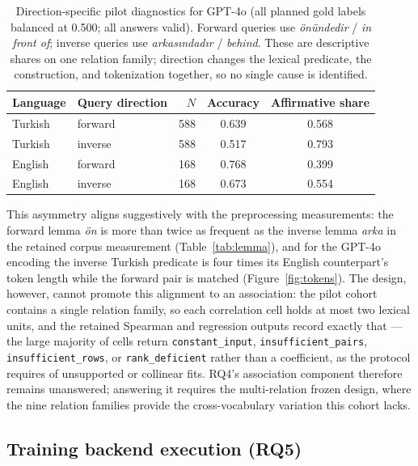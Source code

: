 \begin{table}[t]
  \centering
  \caption{Direction-specific pilot diagnostics for GPT-4o (all planned gold labels balanced at 0.500;
  all answers valid). Forward queries use \emph{önündedir} / \emph{in front of}; inverse queries use
  \emph{arkasındadır} / \emph{behind}. These are descriptive shares on one relation family; direction
  changes the lexical predicate, the construction, and tokenization together, so no single cause is
  identified.}
  \label{tab:direction}
  \small
  \begin{tabular}{@{}llrcc@{}}
    \toprule
    Language & Query direction & $N$ & Accuracy & Affirmative share \\
    \midrule
    Turkish & forward & 588 & 0.639 & 0.568 \\
    Turkish & inverse & 588 & 0.517 & 0.793 \\
    English & forward & 168 & 0.768 & 0.399 \\
    English & inverse & 168 & 0.673 & 0.554 \\
    \bottomrule
  \end{tabular}
\end{table}

This asymmetry aligns suggestively with the preprocessing measurements: the forward lemma \emph{ön} is
more than twice as frequent as the inverse lemma \emph{arka} in the retained corpus measurement
(Table~\ref{tab:lemma}), and for the GPT-4o encoding the inverse Turkish predicate is four times its
English counterpart's token length while the forward pair is matched (Figure~\ref{fig:tokens}). The
design, however, cannot promote this alignment to an association: the pilot cohort contains a single
relation family, so each correlation cell holds at most two lexical units, and the retained Spearman and
regression outputs record exactly that --- the large majority of cells return \texttt{constant\_input},
\texttt{insufficient\_pairs}, \texttt{insufficient\_rows}, or \texttt{rank\_deficient} rather than a
coefficient, as the protocol requires of unsupported or collinear fits. RQ4's association component
therefore remains unanswered; answering it requires the multi-relation frozen design, where the nine
relation families provide the cross-vocabulary variation this cohort lacks.

\subsection{Training backend execution (RQ5)}

